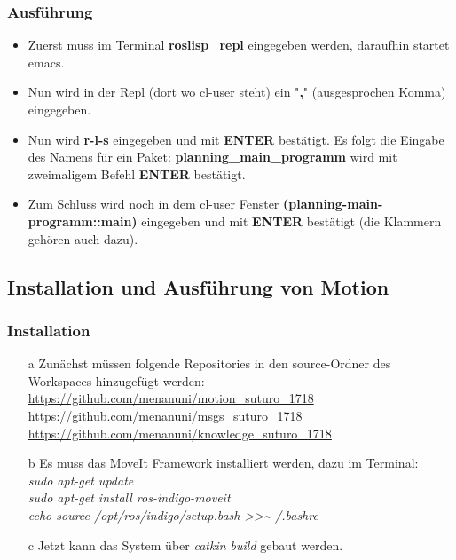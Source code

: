 \documentclass{suturo}
\begin{document}
\subsubsection{Ausführung}
\begin{itemize}

\item Zuerst muss im Terminal \textbf{roslisp\_repl} eingegeben werden, daraufhin startet emacs. 

\item Nun wird in der Repl (dort wo cl-user steht) ein "\textbf{,}" (ausgesprochen Komma) eingegeben.

\item Nun wird \textbf{r-l-s} eingegeben und mit \textbf{ENTER} bestätigt. Es folgt die Eingabe des Namens für ein Paket: \textbf{planning\_main\_programm} wird mit zweimaligem Befehl \textbf{ENTER} bestätigt.

\item Zum Schluss wird noch in dem cl-user Fenster \textbf{(planning-main-programm::main)} eingegeben und mit \textbf{ENTER} bestätigt (die Klammern gehören auch dazu).
\end{itemize}


\subsection{Installation und Ausführung von Motion}

\subsubsection{Installation}
\begin{itemize}


\item[a] Zunächst müssen folgende Repositories in den source-Ordner des Workspaces hinzugefügt werden:  \\
\url{https://github.com/menanuni/motion_suturo_1718} \\
\url{https://github.com/menanuni/msgs_suturo_1718} \\
\url{https://github.com/menanuni/knowledge_suturo_1718} \\

\item[b] Es muss das MoveIt Framework installiert werden, dazu im Terminal: \\
\textit{sudo apt-get update} \\
\textit{sudo apt-get install ros-indigo-moveit} \\
\textit{echo  \grqq{}source /opt/ros/indigo/setup.bash\grqq{} \textgreater\textgreater \textasciitilde{ }/.bashrc} \\

\item[c] Jetzt kann das System über \textit{catkin build} gebaut werden.

\end{itemize}
\end{document}
